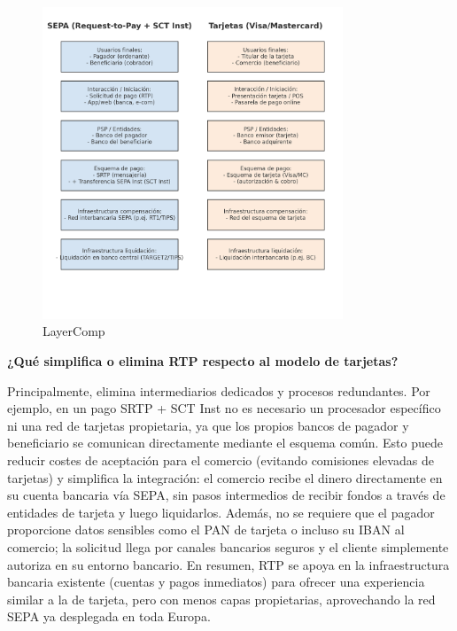 \begin{figure}[H]
  \centering
  \includegraphics[width=0.8\textwidth]{Imagenes/LayerComp.png}
  \caption{LayerComp}
  \label{fig:Esquema por capas comparación}
\end{figure}

\bigskip

\noindent\textbf{¿Qué simplifica o elimina RTP respecto al modelo de tarjetas?}

Principalmente, elimina intermediarios dedicados y procesos redundantes. Por ejemplo, en un pago SRTP + SCT Inst no es necesario un procesador específico ni una red de tarjetas propietaria, ya que los propios bancos de pagador y beneficiario se comunican directamente mediante el esquema común. Esto puede reducir costes de aceptación para el comercio (evitando comisiones elevadas de tarjetas) y simplifica la integración: el comercio recibe el dinero directamente en su cuenta bancaria vía SEPA, sin pasos intermedios de recibir fondos a través de entidades de tarjeta y luego liquidarlos. Además, no se requiere que el pagador proporcione datos sensibles como el PAN de tarjeta o incluso su IBAN al comercio; la solicitud llega por canales bancarios seguros y el cliente simplemente autoriza en su entorno bancario. En resumen, RTP se apoya en la infraestructura bancaria existente (cuentas y pagos inmediatos) para ofrecer una experiencia similar a la de tarjeta, pero con menos capas propietarias, aprovechando la red SEPA ya desplegada en toda Europa.




